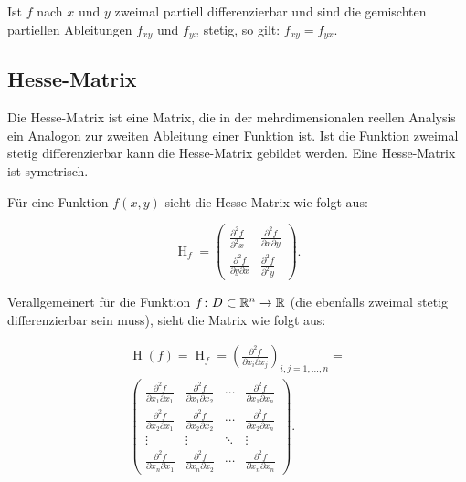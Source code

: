 \begin{satz}
Ist $f$ nach $x$ und $y$ zweimal partiell differenzierbar und sind die gemischten
partiellen Ableitungen $f_{xy}$ und $f_{yx}$ stetig, so gilt: $f_{xy} = f_{yx}$.
\end{satz}

\subsection{Hesse-Matrix}
Die Hesse-Matrix ist eine Matrix, die in der mehrdimensionalen reellen Analysis ein Analogon zur zweiten Ableitung einer Funktion ist. Ist die Funktion zweimal stetig differenzierbar kann die Hesse-Matrix gebildet werden. Eine Hesse-Matrix ist symetrisch.

Für eine Funktion $f(x,y)$ sieht die Hesse Matrix wie folgt aus:

$$\operatorname{H}_f=
\begin{pmatrix}
\frac{\partial^2 f}{\partial^2 x}&\frac{\partial^2 f}{\partial x\partial y}\\
\frac{\partial^2 f}{\partial y\partial x}&\frac{\partial^2 f}{\partial^2 y}
\end{pmatrix}.$$

Verallgemeinert für die Funktion $f \colon D \subset \mathbb{R}^n \to \mathbb{R}$  (die ebenfalls zweimal stetig differenzierbar sein muss), sieht die Matrix wie folgt aus:

\begin{equation}\begin{split}\operatorname{H}(f)=\operatorname{H}_f=
\left(\frac{\partial^2f}{\partial x_i\partial x_j}\right)_{i,j=1,\dots, n}= \\
\begin{pmatrix}
\frac{\partial^2 f}{\partial x_1\partial x_1}&\frac{\partial^2 f}{\partial x_1\partial x_2}&\cdots&\frac{\partial^2  f}{\partial x_1\partial x_n}\\[0.5em]
\frac{\partial^2 f}{\partial x_2\partial x_1}&\frac{\partial^2 f}{\partial x_2\partial x_2}&\cdots&\frac{\partial^2  f}{\partial x_2\partial x_n}\\
\vdots&\vdots&\ddots&\vdots\\
\frac{\partial^2 f}{\partial x_n\partial x_1}&\frac{\partial^2 f}{\partial x_n\partial x_2}&\cdots&\frac{\partial^2  f}{\partial x_n\partial x_n}
\end{pmatrix}.\end{split}\end{equation}

